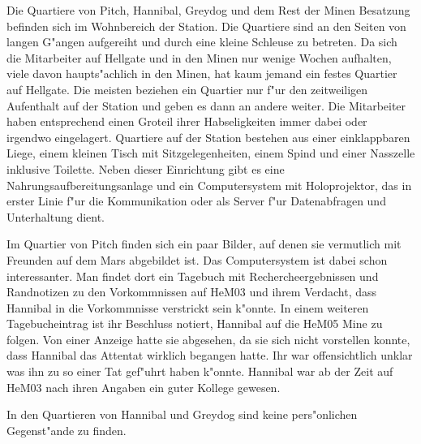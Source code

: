 
Die Quartiere von Pitch, Hannibal, Greydog und dem Rest der Minen Besatzung befinden sich im Wohnbereich der Station. Die Quartiere sind an den Seiten von langen G"angen aufgereiht und durch eine kleine Schleuse zu betreten. Da sich die Mitarbeiter auf Hellgate und in den Minen nur wenige Wochen aufhalten, viele davon haupts"achlich in den Minen, hat kaum jemand ein festes Quartier auf Hellgate. Die meisten beziehen ein Quartier nur f"ur den zeitweiligen Aufenthalt auf der Station und geben es dann an andere weiter. Die Mitarbeiter haben entsprechend einen Gro\3teil ihrer Habseligkeiten immer dabei oder irgendwo eingelagert. Quartiere auf der Station bestehen aus einer einklappbaren Liege, einem kleinen Tisch mit Sitzgelegenheiten, einem Spind und einer Nasszelle inklusive Toilette. Neben dieser Einrichtung gibt es eine Nahrungsaufbereitungsanlage und ein Computersystem mit Holoprojektor, das in erster Linie f"ur die Kommunikation oder als Server f"ur Datenabfragen und Unterhaltung dient.

Im Quartier von Pitch finden sich ein paar Bilder, auf denen sie vermutlich mit Freunden auf dem Mars abgebildet ist. Das Computersystem ist dabei schon interessanter. Man findet dort ein Tagebuch mit Rechercheergebnissen und Randnotizen zu den Vorkommnissen auf HeM03 und ihrem Verdacht, dass Hannibal in die Vorkommnisse verstrickt sein k"onnte. In einem weiteren Tagebucheintrag ist ihr Beschluss notiert, Hannibal auf die HeM05 Mine zu folgen. Von einer Anzeige hatte sie abgesehen, da sie sich nicht vorstellen konnte, dass Hannibal das Attentat wirklich begangen hatte. Ihr war offensichtlich unklar was ihn zu so einer Tat gef"uhrt haben k"onnte. Hannibal war ab der Zeit auf HeM03 nach ihren Angaben ein guter Kollege gewesen.

In den Quartieren von Hannibal und Greydog sind keine pers"onlichen Gegenst"ande zu finden.

